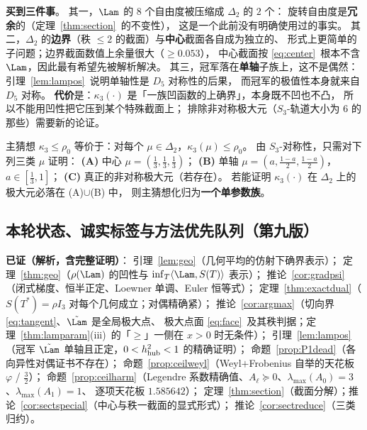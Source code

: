 \begin{remark}[这条分解买到了什么]\label{rmk:sectread}
\textbf{买到三件事}。
其一，$\Lam$ 的 $8$ 个自由度被压缩成 $\Delta_2$ 的 $2$ 个：
旋转自由度是\textbf{冗余}的（定理~\ref{thm:section}~的不变性），
这是一个此前没有明确使用过的事实。
其二，$\Delta_2$ 的\textbf{边界}（秩 $\le2$ 的截面）与\textbf{中心}截面各自成为独立的、
形式上更简单的子问题；边界截面数值上余量很大（$\ge0.053$），
中心截面按 \eqref{eq:center}~根本不含 $\Lam$，因此最有希望先被解析解决。
其三，冠军落在\textbf{单轴}子族上，这不是偶然：
引理~\ref{lem:lampos}~说明单轴性是 $D_5$ 对称性的后果，
而冠军的极值性本身就来自 $D_5$ 对称。
\textbf{代价}是：$\kappa_3(\cdot)$ 是「一族凹函数的上确界」，本身既不凹也不凸，
所以不能用凹性把它压到某个特殊截面上；
排除非对称极大元（$S_3$-轨道大小为 $6$ 的那些）需要新的论证。
\end{remark}

\begin{corollary}[归约的精确形式]\label{cor:sectreduce}
主猜想 $\kappa_3\le\rho_0$ 等价于：对每个 $\mu\in\Delta_2$，$\kappa_3(\mu)\le\rho_0$。
由 $S_3$-对称性，只需对下列三类 $\mu$ 证明：
\textbf{(A)} 中心 $\mu=(\frac13,\frac13,\frac13)$；
\textbf{(B)} 单轴 $\mu=(a,\frac{1-a}2,\frac{1-a}2)$，$a\in[\frac13,1]$；
\textbf{(C)} 真正的非对称极大元（若存在）。
若能证明 $\kappa_3(\cdot)$ 在 $\Delta_2$ 上的极大元必落在 (A)$\cup$(B) 中，
则主猜想化归为\textbf{一个单参数族}。
\end{corollary}

\subsection{本轮状态、诚实标签与方法优先队列（第九版）}\label{sec:r19:status}

\textbf{已证（解析，含完整证明）}：
引理~\ref{lem:geo}（几何平均的仿射下确界表示）；
定理~\ref{thm:geo}（$\rho(\Lam)$ 的凹性与 $\inf_T\langle\Lam,S(T)\rangle$ 表示）；
推论~\ref{cor:gradpsi}（闭式梯度、恒半正定、Loewner 单调、Euler 恒等式）；
定理~\ref{thm:exactdual}（$S(T^*)=\rho I_3$ 对每个几何成立；对偶精确紧）；
推论~\ref{cor:argmax}（切向界 \eqref{eq:tangent}、$\tilde\Lam$ 是全局极大点、
极大点面 \eqref{eq:face}~及其秩判据；定理~\ref{thm:lamparam}(iii)~的「$\ge$」一侧在 $x>0$ 时无条件）；
引理~\ref{lem:lampos}（冠军 $\tilde\Lam$ 单轴且正定，$0<h_{\rm hub}^2<1$ 的精确证明）；
命题~\ref{prop:P1dead}（各向异性对偶证书不存在）；
命题~\ref{prop:ceilweyl}（Weyl$+$Frobenius 自举的天花板 $\varphi$ / $\frac32$）；
命题~\ref{prop:ceilharm}（Legendre 系数精确值、$A_\ell\succeq0$、$\lambda_{\max}(A_0)=3$、$\lambda_{\max}(A_1)=1$、
逐项天花板 $1.585642$）；
定理~\ref{thm:section}（截面分解）；推论~\ref{cor:sectspecial}（中心与秩一截面的显式形式）；
推论~\ref{cor:sectreduce}（三类归约）。

